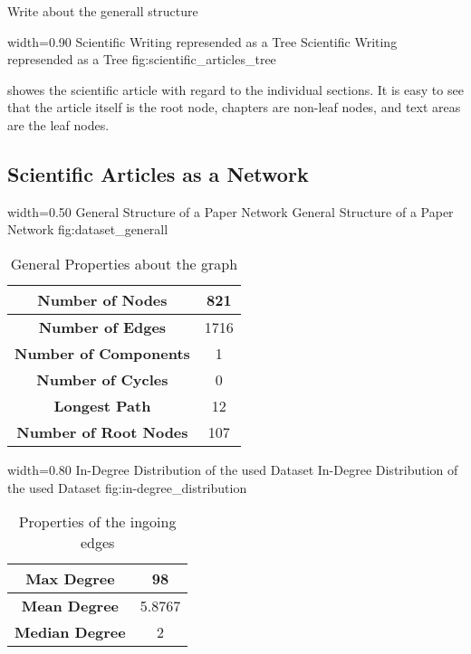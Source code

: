 Write about the generall structure

      {width=0.90\textwidth}
      {Scientific Writing represended as a Tree}
      {Scientific Writing represended as a Tree}
      {fig:scientific_articles_tree}

 showes the scientific article with regard to the individual sections. It is easy to see that the article itself is the root node, chapters are non-leaf nodes, and text areas are the leaf nodes.

\subsection{Scientific Articles as a Network}
\label{sec:scientific_articles_as_a_network}

      {width=0.50\textwidth}
      {General Structure of a Paper Network}
      {General Structure of a Paper Network}
      {fig:dataset_generall}

\begin{table}
  \centering
  \begin{tabular}{ | c | c | }
    \hline
    \textbf{Number of Nodes} & 821 \\ \hline
    \textbf{Number of Edges} & 1716 \\ \hline
    \textbf{Number of Components} & 1 \\ \hline
    \textbf{Number of Cycles} & 0 \\ \hline
    \textbf{Longest Path} & 12 \\ \hline
    \textbf{Number of Root Nodes} & 107 \\ \hline
  \end{tabular}
  \caption[General Properties about the graph in the used dataset]{General Properties about the graph}
  \label{tbl:general_properties_about_the_graph}
\end{table}


      {width=0.80\textwidth}
      {In-Degree Distribution of the used Dataset}
      {In-Degree Distribution of the used Dataset}
      {fig:in-degree_distribution}

\begin{table}
  \centering
  \begin{tabular}{ | c | c | }
    \hline
    \textbf{Max Degree} & 98 \\ \hline
    \textbf{Mean Degree} & 5.8767 \\ \hline
    \textbf{Median Degree} & 2 \\ \hline
  \end{tabular}
  \caption[Properties of the ingoing edges in the used dataset]{Properties of the ingoing edges}
  \label{tbl:properties_ingoing_edges}
\end{table}


